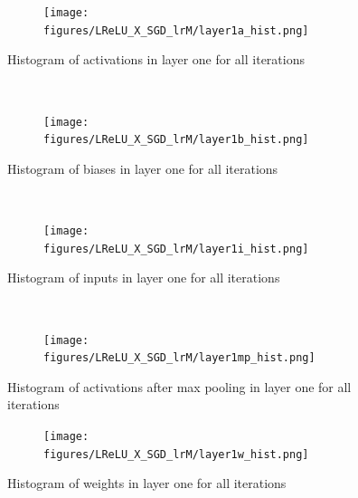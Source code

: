\documentclass[]{article}
\begin{document}
\begin{figure}[ht]
    \centering
    \begin{subfigure}
        \centering
        \texttt{[image: figures/LReLU\_X\_SGD\_lrM/layer1a\_hist.png]}
    \end{subfigure}%
    \caption{Histogram of activations in layer one for all iterations}
 \label{fig:/layer1a_hist2}
    ~ 
    \centering
    \begin{subfigure}
        \centering
        \texttt{[image: figures/LReLU\_X\_SGD\_lrM/layer1b\_hist.png]}
    \end{subfigure}%
    \caption{Histogram of biases in  layer one for all iterations}
 \label{fig:/layer1b_hist2}
    ~ 
    \centering
    \begin{subfigure}
        \centering
        \texttt{[image: figures/LReLU\_X\_SGD\_lrM/layer1i\_hist.png]}
    \end{subfigure}%
    \caption{Histogram of  inputs in  layer one for all iterations}
 \label{fig:/layer1i_hist2}
    ~ 
    \centering
    \begin{subfigure}
        \centering
        \texttt{[image: figures/LReLU\_X\_SGD\_lrM/layer1mp\_hist.png]}
    \end{subfigure}%
    \caption{Histogram of activations after max pooling in  layer one for all iterations}
 \label{fig:/layer1mp_hist2}
\end{figure}

\begin{figure}
    \centering
    \begin{subfigure}
        \centering
        \texttt{[image: figures/LReLU\_X\_SGD\_lrM/layer1w\_hist.png]}
    \end{subfigure}%
    \caption{Histogram of weights in  layer one for all iterations}
 \label{fig:/layer1w_hist2}
\end{figure}
\end{document}
